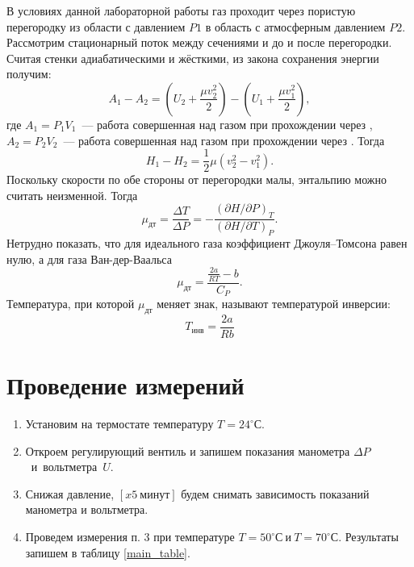 \documentclass[a4paper,12pt]{article} %
\newcommand{\RomanNumeralCaps}[1]
{\MakeUppercase{\romannumeral #1}}
\begin{document}
\noindent В условиях данной лабораторной работы газ проходит через пористую
перегородку из области с давлением $ P1 $ в область с атмосферным давлением 
$ P2 $. Рассмотрим стационарный поток между сечениями \RomanNumeralCaps{1}
и \RomanNumeralCaps{2} до и после перегородки. Считая стенки
адиабатическими и жёсткими, из закона сохранения энергии получим: 
\begin{equation}\label{}
	A_1-A_2=
	\left(U_2+\dfrac{\mu v_2^2}{2}\right)-
	\left(U_1+\dfrac{\mu v_1^2}{2}\right),
\end{equation}
где $ A_1=P_1V_1 $~--- работа совершенная над газом при прохождении
через \RomanNumeralCaps{1}, $ A_2=P_2V_2 $~--- работа совершенная над
газом при прохождении через \RomanNumeralCaps{2}. Тогда
\begin{equation}\label{}
	H_1-H_2=\dfrac{1}{2}\mu(v_2^2-v_1^2).
\end{equation}
Поскольку скорости по обе стороны от перегородки малы, энтальпию можно
считать неизменной. Тогда 
\begin{equation}\label{}
	\mu_{дт}=\dfrac{\Delta T}{\Delta P}=
	-\dfrac{(\partial H/\partial P)_T}{(\partial H/\partial T)_P}.
\end{equation}
Нетрудно показать, что для идеального газа коэффициент Джоуля–Томсона равен
нулю, а для газа Ван-дер-Ваальса 
\begin{equation}\label{}
	\mu_{дт}=\dfrac{\frac{2a}{RT}-b}{C_P}.
\end{equation}
Температура, при которой $ \mu_{дт} $ меняет знак, называют температурой
инверсии: 
\begin{equation}\label{}
	T_{инв}=\dfrac{2a}{Rb}
\end{equation}


\section{Проведение измерений}
\begin{enumerate}
	\item Установим на термостате температуру $ T=24^\circ С $. 
	\item Откроем регулирующий вентиль и запишем показания 
	манометра $ \Delta P $~и~вольтметра~$ U $. 
	\item Снижая давление, $ [x5~минут] $ будем снимать зависимость
	показаний манометра и вольтметра.
	\item Проведем измерения п. 3 при температуре
	$ T=50^\circ С~и~T=70^\circ С $. Результаты запишем в таблицу \ref{main_table}.
\end{enumerate}
\end{document}
